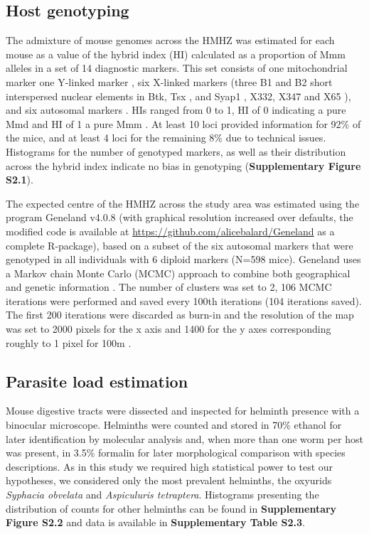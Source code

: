 \subsection{Host genotyping}
The admixture of mouse genomes across the HMHZ was estimated for each mouse as a value of the hybrid index (HI) calculated as a proportion of Mmm alleles in a set of 14 diagnostic markers. This set consists of one mitochondrial marker \parencite[BamHI, a restriction site in the Nd1 gene;][]{bozikova_mitochondrial_2005, munclinger_genetic_2002} one Y-linked marker \parencite[presence/absence of a short insertion in the Zfy2 gene;][]{boissinot_discordant_1997, nagamine_musculus-type_1992}, six X-linked markers (three B1 and B2 short interspersed nuclear elements in Btk, Tsx \citep{munclinger_b1_2003}, and Syap1 \citep{macholan_genetic_2007}, X332, X347 and X65 \citep{dufkova_inference_2011, dureje_mouse_2012}), and six autosomal markers \parencite[Es1, H6pd, Idh1, Mpi, Np, Sod1;][]{macholan_genetic_2007}. HIs ranged from 0 to 1, HI of 0 indicating a pure Mmd and HI of 1 a pure Mmm \citep{baird_what_2012, macholan_genetic_2007}. At least 10 loci provided information for 92\% of the mice, and at least 4 loci for the remaining 8\% due to technical issues. Histograms for the number of genotyped markers, as well as their distribution across the hybrid index indicate no bias in genotyping (\textbf{Supplementary Figure S2.1}). 
\par The expected centre of the HMHZ across the study area was estimated using the program Geneland v4.0.8 (with graphical resolution increased over defaults, the modified code is available at \url{https://github.com/alicebalard/Geneland} as a complete R-package), based on a subset of the six autosomal markers that were genotyped in all individuals with 6 diploid markers (N=598 mice). Geneland uses a Markov chain Monte Carlo (MCMC) approach to combine both geographical and genetic information \citep{guillot_geneland_2005}. The number of clusters was set to 2, 106 MCMC iterations were performed and saved every 100th iterations (104 iterations saved). The first 200 iterations were discarded as burn-in and the resolution of the map was set to 2000 pixels for the x axis and 1400 for the y axes corresponding roughly to 1 pixel for 100m \citep{macholan_assessing_2011}.

\subsection{Parasite load estimation}
Mouse digestive tracts were dissected and inspected for helminth presence with a binocular microscope. Helminths were counted and stored in 70\% ethanol for later identification by molecular analysis and, when more than one worm per host was present, in 3.5\% formalin for later morphological comparison with species descriptions. As in this study we required high statistical power to test our hypotheses, we considered only the most prevalent helminths, the oxyurids \textit{Syphacia obvelata} and \textit{Aspiculuris tetraptera}. Histograms presenting the distribution of  counts for other helminths can be found in \textbf{Supplementary Figure S2.2} and data is available in \textbf{Supplementary Table S2.3}.

